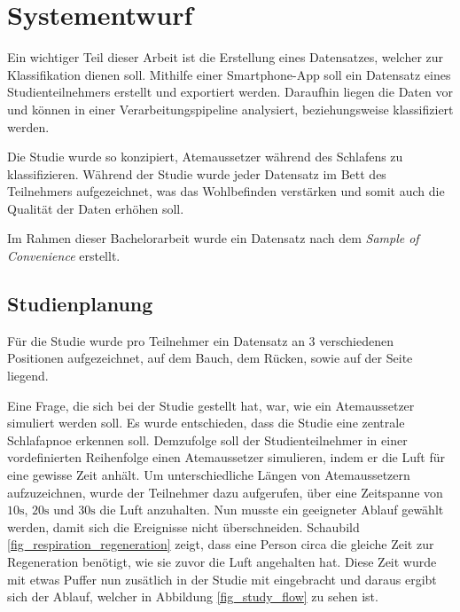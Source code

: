 \chapter{Systementwurf}
\label{ch:Design}

Ein wichtiger Teil dieser Arbeit ist die Erstellung eines Datensatzes, welcher zur Klassifikation dienen soll.
Mithilfe einer Smartphone-App soll ein Datensatz eines Studienteilnehmers erstellt und exportiert werden. 
Daraufhin liegen die Daten vor und können in einer Verarbeitungspipeline analysiert, beziehungsweise klassifiziert werden.

Die Studie wurde so konzipiert, Atemaussetzer während des Schlafens zu klassifizieren. 
Während der Studie wurde jeder Datensatz im Bett des Teilnehmers aufgezeichnet, was das Wohlbefinden verstärken und somit auch die Qualität der Daten erhöhen soll.

Im Rahmen dieser Bachelorarbeit wurde ein Datensatz  nach dem \textit{Sample of Convenience} erstellt.

\section{Studienplanung}
\label{ch:Design:sec:studienplanung}
Für die Studie wurde pro Teilnehmer ein Datensatz an 3 verschiedenen Positionen aufgezeichnet, auf dem Bauch, dem Rücken, sowie auf der Seite liegend.

Eine Frage, die sich bei der Studie gestellt hat, war, wie ein Atemaussetzer {\glqq simuliert\grqq} werden soll. 
Es wurde entschieden, dass die Studie eine zentrale Schlafapnoe erkennen soll. 
Demzufolge soll der Studienteilnehmer in einer vordefinierten Reihenfolge einen Atemaussetzer {\glqq simulieren\grqq}, indem er die Luft für eine gewisse Zeit anhält.
Um unterschiedliche Längen von Atemaussetzern aufzuzeichnen, wurde der Teilnehmer dazu aufgerufen, über eine Zeitspanne von $10\si{\s}$, $20\si{\s}$ und $30\si{\s}$ die Luft anzuhalten.
Nun musste ein geeigneter Ablauf gewählt werden, damit sich die Ereignisse nicht überschneiden.
Schaubild \ref{fig_respiration_regeneration} zeigt, dass eine Person circa die gleiche Zeit zur Regeneration benötigt, wie sie zuvor die Luft angehalten hat.
Diese Zeit wurde mit etwas Puffer nun zusätlich in der Studie mit eingebracht und daraus ergibt sich der Ablauf, welcher in Abbildung \ref{fig_study_flow} zu sehen ist.

